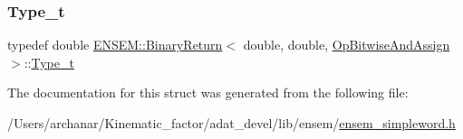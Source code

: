 \mbox{\label{structENSEM_1_1BinaryReturn_3_01double_00_01double_00_01OpBitwiseAndAssign_01_4_aa3e34db7c5a718f74845bd8e24088ed0}} 
\subsubsection{\texorpdfstring{Type\_t}{Type\_t}\hspace{0.1cm}{\footnotesize\ttfamily [2/2]}}
{\footnotesize\ttfamily typedef double \mbox{\hyperlink{structENSEM_1_1BinaryReturn}{E\+N\+S\+E\+M\+::\+Binary\+Return}}$<$ double, double, \mbox{\hyperlink{structENSEM_1_1OpBitwiseAndAssign}{Op\+Bitwise\+And\+Assign}} $>$\+::\mbox{\hyperlink{structENSEM_1_1BinaryReturn_3_01double_00_01double_00_01OpBitwiseAndAssign_01_4_aa3e34db7c5a718f74845bd8e24088ed0}{Type\+\_\+t}}}



The documentation for this struct was generated from the following file\+:\begin{DoxyCompactItemize}
\item 
/\+Users/archanar/\+Kinematic\+\_\+factor/adat\+\_\+devel/lib/ensem/\mbox{\hyperlink{lib_2ensem_2ensem__simpleword_8h}{ensem\+\_\+simpleword.\+h}}\end{DoxyCompactItemize}
